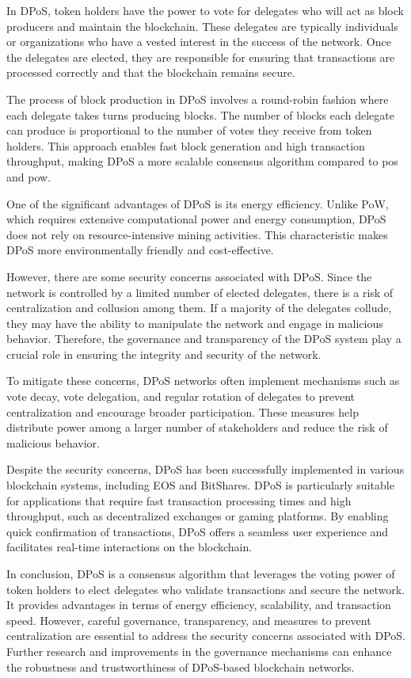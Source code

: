 In DPoS, token holders have the power to vote for delegates who will act as block producers and maintain the blockchain. These delegates are typically individuals or organizations who have a vested interest in the success of the network. Once the delegates are elected, they are responsible for ensuring that transactions are processed correctly and that the blockchain remains secure.

The process of block production in DPoS involves a round-robin fashion where each delegate takes turns producing blocks. The number of blocks each delegate can produce is proportional to the number of votes they receive from token holders. This approach enables fast block generation and high transaction throughput, making DPoS a more scalable consensus algorithm compared to \gls{pos} and \gls{pow}.

One of the significant advantages of DPoS is its energy efficiency. Unlike PoW, which requires extensive computational power and energy consumption, DPoS does not rely on resource-intensive mining activities. This characteristic makes DPoS more environmentally friendly and cost-effective.

However, there are some security concerns associated with DPoS. Since the network is controlled by a limited number of elected delegates, there is a risk of centralization and collusion among them. If a majority of the delegates collude, they may have the ability to manipulate the network and engage in malicious behavior. Therefore, the governance and transparency of the DPoS system play a crucial role in ensuring the integrity and security of the network.

To mitigate these concerns, DPoS networks often implement mechanisms such as vote decay, vote delegation, and regular rotation of delegates to prevent centralization and encourage broader participation. These measures help distribute power among a larger number of stakeholders and reduce the risk of malicious behavior.

Despite the security concerns, DPoS has been successfully implemented in various blockchain systems, including EOS and BitShares. DPoS is particularly suitable for applications that require fast transaction processing times and high throughput, such as decentralized exchanges or gaming platforms. By enabling quick confirmation of transactions, DPoS offers a seamless user experience and facilitates real-time interactions on the blockchain.

In conclusion, DPoS is a consensus algorithm that leverages the voting power of token holders to elect delegates who validate transactions and secure the network. It provides advantages in terms of energy efficiency, scalability, and transaction speed. However, careful governance, transparency, and measures to prevent centralization are essential to address the security concerns associated with DPoS. Further research and improvements in the governance mechanisms can enhance the robustness and trustworthiness of DPoS-based blockchain networks.

